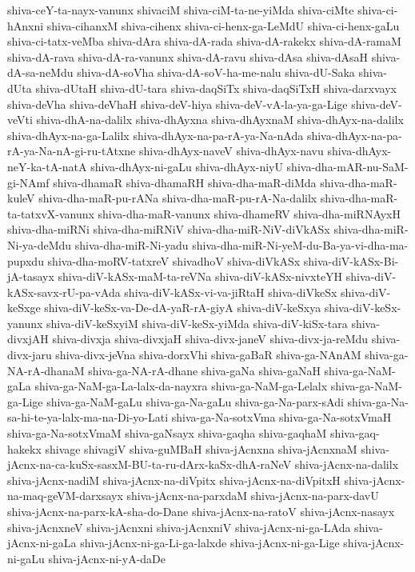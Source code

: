 {shiva-ceY-ta-nayx-vanunx
shivaciM
shiva-ciM-ta-ne-yiMda
shiva-ciMte
shiva-ci-hAnxni
shiva-cihanxM
shiva-cihenx
shiva-ci-henx-ga-LeMdU
shiva-ci-henx-gaLu
shiva-ci-tatx-veMba
shiva-dAra
shiva-dA-rada
shiva-dA-rakekx
shiva-dA-ramaM
shiva-dA-rava
shiva-dA-ra-vanunx
shiva-dA-ravu
shiva-dAsa
shiva-dAsaH
shiva-dA-sa-neMdu
shiva-dA-soVha
shiva-dA-soV-ha-me-nalu
shiva-dU-Saka
shiva-dUta
shiva-dUtaH
shiva-dU-tara
shiva-daqSiTx
shiva-daqSiTxH
shiva-darxvayx
shiva-deVha
shiva-deVhaH
shiva-deV-hiya
shiva-deV-vA-la-ya-ga-Lige
shiva-deV-veVti
shiva-dhA-na-dalilx
shiva-dhAyxna
shiva-dhAyxnaM
shiva-dhAyx-na-dalilx
shiva-dhAyx-na-ga-Lalilx
shiva-dhAyx-na-pa-rA-ya-Na-nAda
shiva-dhAyx-na-pa-rA-ya-Na-nA-gi-ru-tAtxne
shiva-dhAyx-naveV
shiva-dhAyx-navu
shiva-dhAyx-neY-ka-tA-natA
shiva-dhAyx-ni-gaLu
shiva-dhAyx-niyU
shiva-dha-mAR-nu-SaM-gi-NAmf
shiva-dhamaR
shiva-dhamaRH
shiva-dha-maR-diMda
shiva-dha-maR-kuleV
shiva-dha-maR-pu-rANa
shiva-dha-maR-pu-rA-Na-dalilx
shiva-dha-maR-ta-tatxvX-vanunx
shiva-dha-maR-vanunx
shiva-dhameRV
shiva-dha-miRNAyxH
shiva-dha-miRNi
shiva-dha-miRNiV
shiva-dha-miR-NiV-diVkASx
shiva-dha-miR-Ni-ya-deMdu
shiva-dha-miR-Ni-yadu
shiva-dha-miR-Ni-yeM-du-Ba-ya-vi-dha-ma-pupxdu
shiva-dha-moRV-tatxreV
shivadhoV
shiva-diVkASx
shiva-diV-kASx-Bi-jA-tasayx
shiva-diV-kASx-maM-ta-reVNa
shiva-diV-kASx-nivxteYH
shiva-diV-kASx-savx-rU-pa-vAda
shiva-diV-kASx-vi-va-jiRtaH
shiva-diVkeSx
shiva-diV-keSxge
shiva-diV-keSx-va-De-dA-yaR-rA-giyA
shiva-diV-keSxya
shiva-diV-keSx-yanunx
shiva-diV-keSxyiM
shiva-diV-keSx-yiMda
shiva-diV-kiSx-tara
shiva-divxjAH
shiva-divxja
shiva-divxjaH
shiva-divx-janeV
shiva-divx-ja-reMdu
shiva-divx-jaru
shiva-divx-jeVna
shiva-dorxVhi
shiva-gaBaR
shiva-ga-NAnAM
shiva-ga-NA-rA-dhanaM
shiva-ga-NA-rA-dhane
shiva-gaNa
shiva-gaNaH
shiva-ga-NaM-gaLa
shiva-ga-NaM-ga-La-lalx-da-nayxra
shiva-ga-NaM-ga-Lelalx
shiva-ga-NaM-ga-Lige
shiva-ga-NaM-gaLu
shiva-ga-Na-gaLu
shiva-ga-Na-parx-sAdi
shiva-ga-Na-sa-hi-te-ya-lalx-ma-na-Di-yo-Lati
shiva-ga-Na-sotxVma
shiva-ga-Na-sotxVmaH
shiva-ga-Na-sotxVmaM
shiva-gaNsayx
shiva-gaqha
shiva-gaqhaM
shiva-gaq-hakekx
shivage
shivagiV
shiva-guMBaH
shiva-jAcnxna
shiva-jAcnxnaM
shiva-jAcnx-na-ca-kuSx-sasxM-BU-ta-ru-dArx-kaSx-dhA-raNeV
shiva-jAcnx-na-dalilx
shiva-jAcnx-nadiM
shiva-jAcnx-na-diVpitx
shiva-jAcnx-na-diVpitxH
shiva-jAcnx-na-maq-geVM-darxsayx
shiva-jAcnx-na-parxdaM
shiva-jAcnx-na-parx-davU
shiva-jAcnx-na-parx-kA-sha-do-Dane
shiva-jAcnx-na-ratoV
shiva-jAcnx-nasayx
shiva-jAcnxneV
shiva-jAcnxni
shiva-jAcnxniV
shiva-jAcnx-ni-ga-LAda
shiva-jAcnx-ni-gaLa
shiva-jAcnx-ni-ga-Li-ga-lalxde
shiva-jAcnx-ni-ga-Lige
shiva-jAcnx-ni-gaLu
shiva-jAcnx-ni-yA-daDe
}
